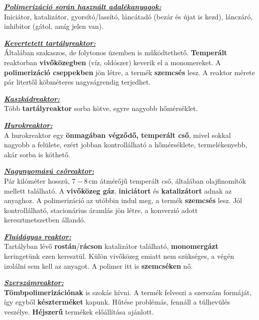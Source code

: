 \documentclass[12pt,a4paper]{article}       %
\newcounter{questionctr}
\newenvironment{question}[1]{
  \refstepcounter{questionctr}
  \begin{tcolorbox}[
    colback=gray!25,
    colbacktitle=red!10!yellow!50,
    enhanced,
    sharp corners,
    boxrule=0mm,
    frame hidden,
    breakable,
    enhanced jigsaw,
    title={\textcolor{black}{\textsc{\# \thequestionctr{} – #1}}}
  ]


}{\end{tcolorbox}}
\begin{document}
\begin{question}{
    Milyen reaktortípusokat használnak polimerek előállítására? Hogyan működnek
    ezek? Milyen vivőközeget és adalékokat használnak a polimerizáció során?
  }
  \underline{\textbf{\textit{Polimerizáció során használt adalékanyagok:}}} \\
  Iniciátor, katalizátor, gyorsító/lassító, láncátadó (bezár és újat is kezd),
  lánczáró, inhibitor (gátol, amíg jelen van).
  \tcbline

  \underline{\textbf{\textit{Kevertetett tartályreaktor:}}} \\
  Általában szakaszos, de folytonos üzemben is működtethető. \textbf{Temperált}
  reaktorban \textbf{vivőközegben} (víz, oldószer) keverik el a monomereket. A
  \textbf{polimerizáció cseppekben} jön létre, a termék \textbf{szemcsés} lesz.
  A reaktor mérete pár litertől köbméteres nagyságrendig terjedhet.
  \tcbline

  \underline{\textbf{\textit{Kaszkádreaktor:}}} \\
  Több \textbf{tartályreaktor} sorba kötve, egyre nagyobb hőmérséklet.
  \tcbline

  \underline{\textbf{\textit{Hurokreaktor:}}} \\
  A hurokreaktor egy \textbf{önmagában végződő, temperált cső}, mivel sokkal
  nagyobb a felülete, ezért jobban kontrollálható a hőmérséklete,
  termelékenyebb, akár sorba is köthető. \tcbline

  \underline{\textbf{\textit{Nagynyomású csőreaktor:}}} \\
  Pár kilóméter hosszú, $7-8\,\mathrm{cm}$ átmérőjű temperált cső, általában
  olajfinomítók mellett található. A \textbf{vivőközeg gáz},
  \textbf{iniciátort} és \textbf{katalizátort} adnak az anyaghoz. A
  polimerizáció az utóbbin indul meg, a termék \textbf{szemcsés} lesz. Jól
  kontrollálható, stacionárius áramlás jön létre, a konverzió adott
  keresztmetszetben állandó.
  \tcbline

  \underline{\textbf{\textit{Fluidágyas reaktor:}}} \\
  Tartályban lévő \textbf{rostán}/\textbf{rácson} katalizátor található,
  \textbf{monomergázt} keringetünk ezen keresztül. Külön vivőközeg emiatt nem
  szükséges, a végén izolálni sem kell az anyagot. A polimer itt is
  \textbf{szemcséken} nő.
  \tcbline

  \underline{\textbf{\textit{Szerszámreaktor:}}} \\
  \textbf{Tömbpolimerizációnak} is szokás hívni. A termék felveszi a szerszám
  formáját, így egyből \textbf{készterméket} kapunk. Hűtése problémás, fennáll
  a túlhevülés veszélye. \textbf{Héjszerű} termékek előállítása ajánlott.
\end{question}
\end{document}
